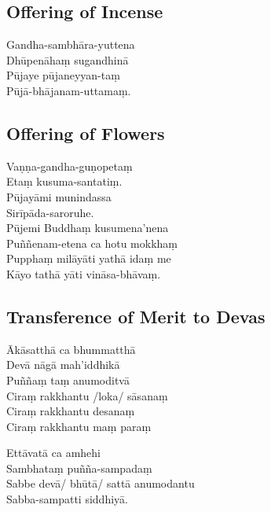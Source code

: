 \subsection{Offering of Incense}


\begin{paritta}
Gandha-sambhāra-yuttena\\
Dhūpenāhaṃ sugandhinā\\
Pūjaye pūjaneyyan-taṃ\\
Pūjā-bhājanam-uttamaṃ.
\end{paritta}

\subsection{Offering of Flowers}


\begin{paritta}
Vaṇṇa-gandha-guṇopetaṃ\\
Etaṃ kusuma-santatiṃ.\\
Pūjayāmi munindassa\\
Sirīpāda-saroruhe.\\
Pūjemi Buddhaṃ kusumena'nena\\
Puññenam-etena ca hotu mokkhaṃ\\
Pupphaṃ milāyāti yathā idaṃ me\\
Kāyo tathā yāti vināsa-bhāvaṃ.
\end{paritta}

\subsection{Transference of Merit to Devas}


\begin{paritta}
Ākāsatthā ca bhummatthā\\
Devā nāgā mah'iddhikā\\
Puññaṃ taṃ anumoditvā\\
Ciraṃ rakkhantu /loka/ sāsanaṃ\\
Ciraṃ rakkhantu desanaṃ\\
Ciraṃ rakkhantu maṃ paraṃ
\end{paritta}

\begin{paritta}
Ettāvatā ca amhehi\\
Sambhataṃ puñña-sampadaṃ\\
Sabbe devā/ bhūtā/ sattā anumodantu\\
Sabba-sampatti siddhiyā.
\end{paritta}

